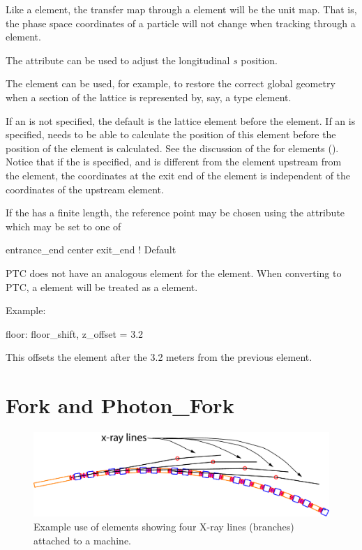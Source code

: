 Like a  element, the transfer map through a  element will be the
unit map. That is, the phase space coordinates of a particle will not change when tracking through a
 element. 

The  attribute can be used to adjust the longitudinal $s$ position.

The  element can be used, for example, to restore the
correct global geometry when a section of the lattice is represented by, say,
a  type element.

If an  is not specified, the default  is the lattice element before
the  element.  If an  is specified, \bmad needs to be able to
calculate the position of this element before the position of the  element is
calculated. See the discussion of the  for  elements
().  Notice that if the  is specified, and is different from the
element upstream from the  element, the coordinates at the exit end of the
 element is independent of the coordinates of the upstream element.

If the  has a finite length, the reference point may be chosen using the
 attribute which may be set to one of
\begin{example}
  entrance_end
  center
  exit_end         ! Default
\end{example}


PTC does not have an analogous element for the  element. When converting to PTC, a
 element will be treated as a  element.

Example: 
\begin{example}
  floor: floor_shift, z_offset = 3.2
\end{example}
This offsets the element after the  3.2 meters from the previous
element.

\section{Fork and Photon_Fork}
\label{s:fork}

\begin{figure}[tb]
  \centering
  \includegraphics[width=5in]{x-fork.pdf}
  \caption[Example with photon_fork elements.]
  {
Example use of  elements showing four X-ray lines (branches) attached to a machine.
  }
  \label{f:x.fork}
\end{figure}

